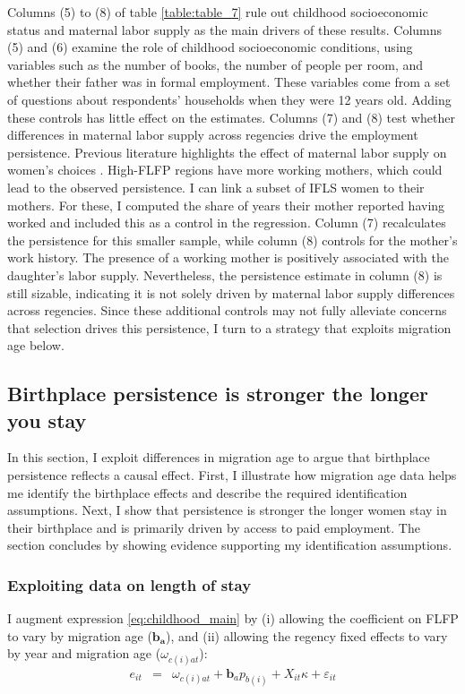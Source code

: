 
Columns (5) to (8) of table  \ref{table:table_7} rule out childhood socioeconomic status and maternal labor supply as the main drivers of these results. Columns (5) and (6) examine the role of childhood socioeconomic conditions, using variables such as the number of books, the number of people per room, and whether their father was in formal employment. These variables come from a set of questions about respondents' households when they were 12 years old. Adding these controls has little effect on the estimates. Columns (7) and (8) test whether differences in maternal labor supply across regencies drive the employment persistence. Previous literature highlights the effect of maternal labor supply on women's choices \citep{Fernandez2004,Morrill2013,Olivettib}. High-FLFP regions have more working mothers, which could lead to the observed persistence. I can link a subset of IFLS women to their mothers. For these, I computed the share of years their mother reported having worked and included this as a control in the regression. Column (7) recalculates the persistence for this smaller sample, while column (8) controls for the mother's work history. The presence of a working mother is positively associated with the daughter's labor supply. Nevertheless, the persistence estimate in column (8) is still sizable, indicating it is not solely driven by maternal labor supply differences across regencies. Since these additional controls may not fully alleviate concerns that selection drives this persistence, I turn to a strategy that exploits migration age below.




\subsection{Birthplace persistence is stronger the longer you stay}	
\label{sec:age}

In this section, I exploit differences in migration age to argue that birthplace persistence reflects a causal effect. First, I illustrate how migration age data helps me identify the birthplace effects and describe the required identification assumptions. Next, I show that persistence is stronger the longer women stay in their birthplace and is primarily driven by access to paid employment. The section concludes by showing evidence supporting my identification assumptions.

\subsubsection{Exploiting data on length of stay}
I augment expression \eqref{eq:childhood_main} by (i) allowing the coefficient on FLFP to vary by migration age ($\boldsymbol{b_a}$), and (ii) allowing the regency fixed effects to vary by year and migration age ($\omega_{c(i)at}$):
\begin{eqnarray}
	\label{eq:childhood_length}
	e_{it}&=&\omega_{c(i)at}+\boldsymbol b_a p_{b(i)}+X_{it}\kappa+\varepsilon_{it}
\end{eqnarray}

